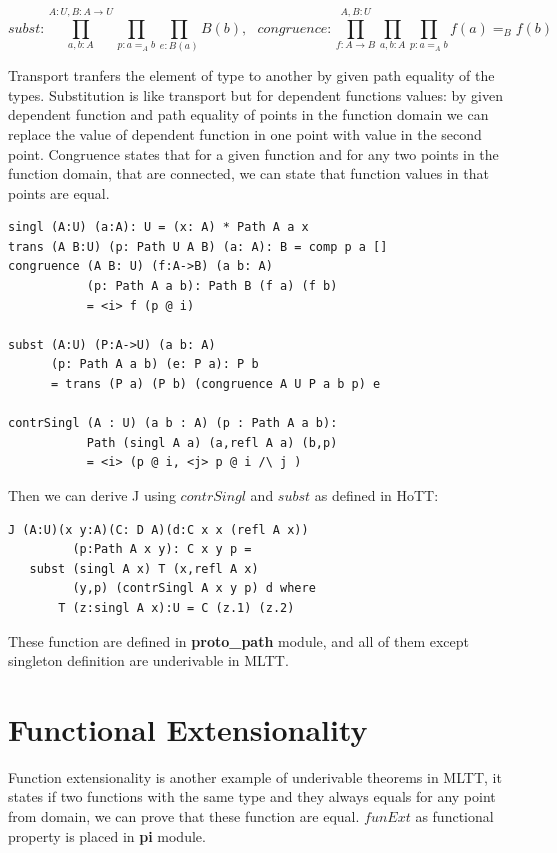 \documentclass{svproc}
\begin{document}
$$subst : \prod_{a,b:A}^{A:U,B:A\rightarrow U} \prod_{p: a =_A b} \prod_{e:B(a)} B(b), \ \ \ 
  congruence : \prod_{f:A\rightarrow B}^{A,B:U} \prod_{a,b:A} \prod_{p:a =_A b} f(a) =_B f(b) $$

Transport tranfers the element of type to another by given path equality of the types.
Substitution is like transport but for dependent functions values: by given dependent function
and path equality of points in the function domain we can replace the value of dependent function
in one point with value in the second point. Congruence states that for a given function
and for any two points in the function domain, that are connected, we can state that function
values in that points are equal.

\begin{lstlisting}[mathescape=true]
singl (A:U) (a:A): U = (x: A) * Path A a x
trans (A B:U) (p: Path U A B) (a: A): B = comp p a []
congruence (A B: U) (f:A->B) (a b: A)
           (p: Path A a b): Path B (f a) (f b)
           = <i> f (p @ i)

subst (A:U) (P:A->U) (a b: A)
      (p: Path A a b) (e: P a): P b
      = trans (P a) (P b) (congruence A U P a b p) e

contrSingl (A : U) (a b : A) (p : Path A a b):
           Path (singl A a) (a,refl A a) (b,p)
           = <i> (p @ i, <j> p @ i /\ j )
\end{lstlisting}

Then we can derive J using $contrSingl$ and $subst$ as defined in HoTT\cite{HoTT}:

\begin{lstlisting}[mathescape=true]
J (A:U)(x y:A)(C: D A)(d:C x x (refl A x))
         (p:Path A x y): C x y p =
   subst (singl A x) T (x,refl A x)
         (y,p) (contrSingl A x y p) d where
       T (z:singl A x):U = C (z.1) (z.2)
\end{lstlisting}

These function are defined in {\bf proto\_path} module, and all of them
except singleton definition are underivable in MLTT.

\section{Functional Extensionality}

Function extensionality is another example of underivable theorems in MLTT, it
states if two functions with the same type and they always equals for
any point from domain, we can prove that these function are equal.
$funExt$ as functional property is placed in {\bf pi} module.
\end{document}
